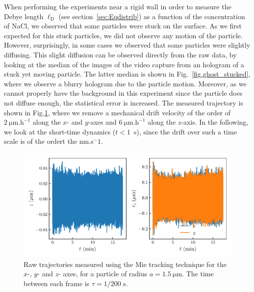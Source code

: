 When performing the experiments near a rigid wall in order to  measure the Debye length $\ell _\mathrm{D}$ (see section~\ref{sec:Eqdistrib}) as a function of the concentration of NaCl, we observed that some particles were stuck on the surface. As we first expected for this stuck particles, we did not observe any motion of the particle. However, surprisingly, in some cases we observed that some particles were slightly diffusing. This slight diffusion can be observed directly from the raw data, by looking at the median of the images of the video capture from an hologram of a stuck yet moving particle. The latter median is shown in Fig.~\ref{fig.ghost_stucked}, where we observe a blurry hologram due to the particle motion. Moreover, as we cannot properly have the background in this experiment since the particle does not diffuse enough, the statistical error is increased. The measured trajectory is shown in Fig.\ref{fig.trajectory_stuck}, where we remove a mechanical drift velocity of the order of $2 ~ \mathrm{\mu m.h^{-1}}$ along the $x$- and $y$-axes and  $6 ~ \mathrm{\mu m.h^{-1}}$ along the $z$-axis. In the following, we look at the short-time dynamics ($t < 1$~s), since the drift over such a time scale is of the ordert the nm.s{$^-1$}.

\begin{figure}[H]
	\centering
	\includegraphics{02_body/chapter4/images/stucked_particle/trajectory_stucked.pdf}
	\caption{Raw trajectories measured using the Mie tracking technique for the $x$-, $y$- and $z$- axes, for a particle of radius $a=1.5 ~\mathrm{\mu m}$. The time between each frame is $\tau = 1/200$ s. ~\href{https://github.com/eXpensia/Confined-Brownian-Motion/blob/main/02_body/chapter4/images/stucked_particle/Full\%20analysis\%20trajectory_using_Dyacine_adding_x_y_distrib.ipynb}{\faGithub}}
	\label{fig.trajectory_stuck}
\end{figure}



